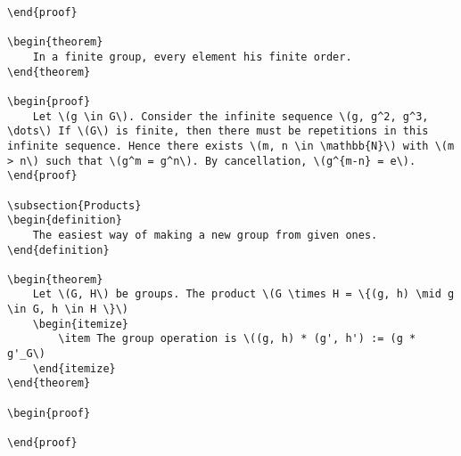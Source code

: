 \documentclass{article}
\theoremstyle{plain}
\newtheorem{theorem}{Theorem}
\newtheorem{definition}{Definition}
\begin{document}
\begin{verbatim}
\end{proof}

\begin{theorem}
    In a finite group, every element his finite order.
\end{theorem}

\begin{proof}
    Let \(g \in G\). Consider the infinite sequence \(g, g^2, g^3, \dots\) If \(G\) is finite, then there must be repetitions in this infinite sequence. Hence there exists \(m, n \in \mathbb{N}\) with \(m > n\) such that \(g^m = g^n\). By cancellation, \(g^{m-n} = e\).
\end{proof}

\subsection{Products}
\begin{definition}
    The easiest way of making a new group from given ones.
\end{definition}

\begin{theorem}
    Let \(G, H\) be groups. The product \(G \times H = \{(g, h) \mid g \in G, h \in H \}\)
    \begin{itemize}
        \item The group operation is \((g, h) * (g', h') := (g * g'_G\)
    \end{itemize}
\end{theorem}

\begin{proof}
    
\end{proof}
\end{verbatim}
\end{document}

